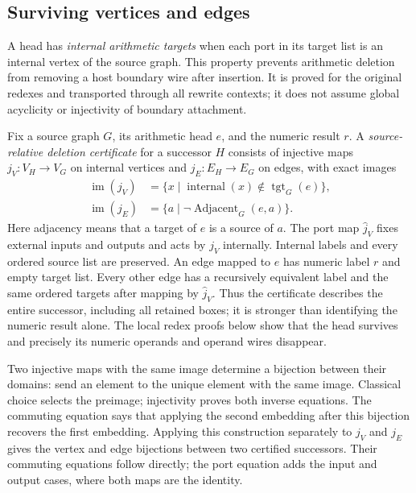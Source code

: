 \subsection{Surviving vertices and edges}

A head has \emph{internal arithmetic targets} when each port in its target
list is an internal vertex of the source graph. This property prevents
arithmetic deletion from removing a host boundary wire after insertion. It is
proved for the original redexes and transported through all rewrite contexts;
it does not assume global acyclicity or injectivity of boundary attachment.


Fix a source graph $G$, its arithmetic head $e$, and the numeric result $r$.
A \emph{source-relative deletion certificate} for a successor $H$ consists of
injective maps $j_V:V_H\to V_G$ on internal vertices and
$j_E:E_H\to E_G$ on edges, with exact images
\[
\begin{split}
\operatorname{im}(j_V)&=\{x\mid\operatorname{internal}(x)\notin\operatorname{tgt}_G(e)\},\\
\operatorname{im}(j_E)&=\{a\mid\neg\operatorname{Adjacent}_G(e,a)\}.
\end{split}
\]
Here adjacency means that a target of $e$ is a source of $a$. The port map
$\widehat j_V$ fixes external inputs and outputs and acts by $j_V$ internally.
Internal labels and every ordered source list are preserved. An edge mapped
to $e$ has numeric label $r$ and empty target list. Every other edge has a
recursively equivalent label and the same ordered targets after mapping by
$\widehat j_V$. Thus the certificate describes the entire successor, including
all retained boxes; it is stronger than identifying the numeric result alone.
The local redex proofs below show that the head survives and precisely its
numeric operands and operand wires disappear.


Two injective maps with the same image determine a bijection between their
domains: send an element to the unique element with the same image. Classical
choice selects the preimage; injectivity proves both inverse equations. The
commuting equation says that applying the second embedding after this bijection
recovers the first embedding. Applying this construction separately to $j_V$
and $j_E$ gives the vertex and edge bijections between two certified successors.
Their commuting equations follow directly; the port equation adds the input
and output cases, where both maps are the identity.

